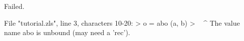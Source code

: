 \runverbatimfalse
{}
\begin{RunVerbatimMsg}
Failed.
\end{RunVerbatimMsg}
\begin{RunVerbatimErr}
File "tutorial.zls", line 3, characters 10-20:
>      o = abo (a, b)
>          ^^^^^^^^^^
The value name abo is unbound (may need a 'rec').
\end{RunVerbatimErr}
